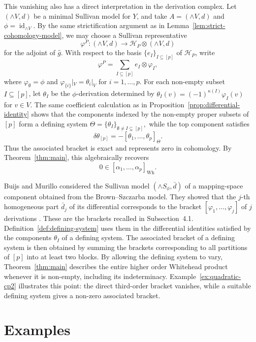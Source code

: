 \documentclass[a4paper,10pt]{amsart}
\theoremstyle{definition}
\theoremstyle{remark}
\newcommand{\id}{\operatorname{id}}
\numberwithin{equation}{section}
\begin{document}
This vanishing also has a direct interpretation in the derivation
complex. Let $(\wedge V,d)$ be a minimal Sullivan model for $Y$, and
take $A=(\wedge V,d)$ and $\phi=\id_{\wedge V}$. By the same
strictification argument as in
Lemma~\ref{lem:strict-cohomology-model}, we may choose a Sullivan
representative
\[
        \varphi^P:
        (\wedge V,d)
        \longrightarrow
        \mathcal{H}_P\otimes(\wedge V,d)
\]
for the adjoint of $\widehat g$. With respect to the basis
$\{e_I\}_{I\subseteq[p]}$ of $\mathcal{H}_P$, write
\[
        \varphi^P
        =
        \sum_{I\subseteq[p]}e_I\otimes\varphi_I,
\]
where $\varphi_{\emptyset}=\phi$ and
$\varphi_{\{i\}}|_V=\theta_i|_V$ for $i=1,\ldots,p$. For each non-empty
subset $I\subseteq[p]$, let $\theta_I$ be the $\phi$-derivation
determined by
$
        \theta_I(v)=(-1)^{\kappa(I)}\varphi_I(v)
$
for $v\in V$. The same coefficient calculation as in
Proposition~\ref{prop:differential-identity} shows that the components
indexed by the non-empty proper subsets of $[p]$ form a defining
system
$
        \Theta=\{\theta_I\}_{\emptyset\neq I\subsetneq[p]},
$
while the top component satisfies
\[
        \delta\theta_{[p]}
        =
        -[\theta_1,\ldots,\theta_p]_{\Theta}.
\]
Thus the associated bracket is exact and represents zero in
cohomology. By Theorem~\ref{thm:main}, this algebraically recovers
\[
        0\in[\alpha_1,\ldots,\alpha_p]_{\mathrm{Wh}}.
\]


Buijs and Murillo considered the Sullivan model $(\wedge S_\phi,\bar d)$ of a mapping-space component obtained from the Brown--Szczarba model.
They showed that the $j$-th homogeneous part $\bar d_j$ of its differential
corresponds to the bracket $[\varphi_1,\ldots,\varphi_j]$ of $j$ derivations \cite[Theorem~15]{BM2008}.
These are the brackets recalled in Subsection~4.1.
Definition~\ref{def:defining-system} uses them in the differential identities satisfied by the components $\theta_I$ of a defining system.
The associated bracket of a defining system is then obtained by summing the brackets corresponding to all partitions of $[p]$ into at least two blocks.
By allowing the defining system to vary,
Theorem~\ref{thm:main} describes the entire higher order Whitehead product whenever it is non-empty, including its indeterminacy.
Example~\ref{ex:quadratic-cp2} illustrates this point: the direct third-order bracket vanishes, while a suitable defining system gives a non-zero associated bracket.




\section{Examples}
\end{document}
